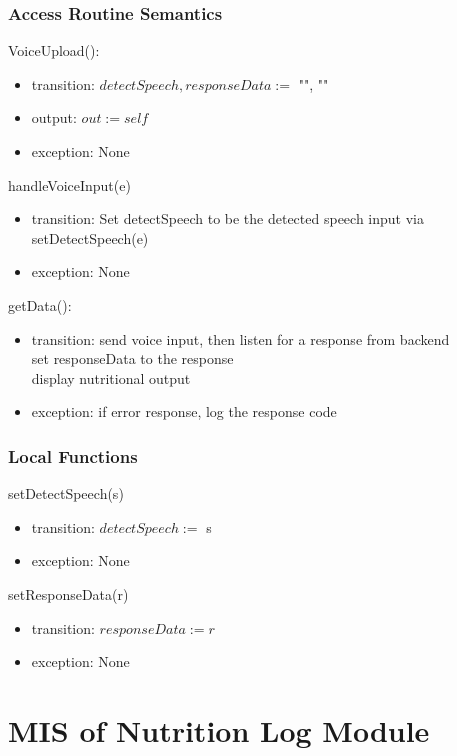 \documentclass[12pt, titlepage]{article}
\begin{document}
\subsubsection{Access Routine Semantics}
\noindent VoiceUpload():
\begin{itemize}
	\item transition: $detectSpeech, responseData :=$ "", ""
	\item output: $out := self$ 
	\item exception: None
\end{itemize}

\noindent handleVoiceInput(e)
\begin{itemize}
	\item transition: Set detectSpeech to be the detected speech input via 
	setDetectSpeech(e)
	\item exception: None
\end{itemize}

\noindent
getData():
\begin{itemize}
	\item transition: send voice input, then listen for a response from 
	backend\\ set responseData to the response\\ display nutritional output
	\item exception: if error response, log the response code
\end{itemize}

\subsubsection{Local Functions}
\noindent setDetectSpeech(s)
\begin{itemize}
	\item transition: $ detectSpeech := $ s
	\item exception: None
\end{itemize}
\noindent setResponseData(r)
\begin{itemize}
	\item transition: $ responseData:=r $
	\item exception: None
\end{itemize}
\newpage

\section{MIS of Nutrition Log Module} \label{Module} 
\end{document}

